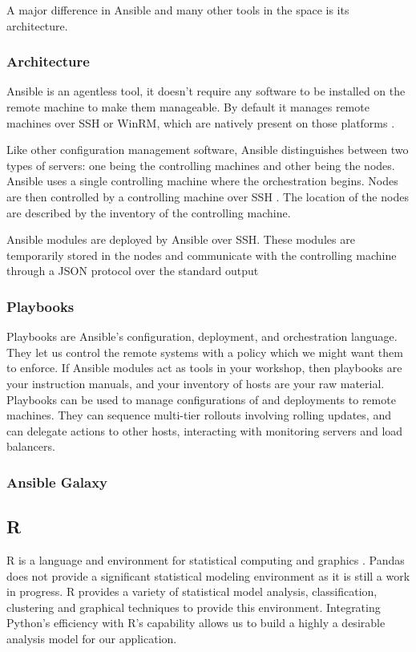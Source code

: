 \documentclass[9pt,twocolumn,twoside]{../../styles/osajnl}
\begin{document}
A major difference in Ansible and many other tools in the
space is its architecture.

\subsubsection{Architecture}
Ansible is an agentless tool, it doesn't require any software to be
installed on the remote machine to make them manageable. By default
it manages remote machines over SSH or WinRM, which are natively
present on those platforms \cite{www-ansible-architecture}.

Like other configuration management software, Ansible
distinguishes between two types of servers: one being the controlling
machines and other being the nodes. Ansible uses a single controlling
machine where the orchestration begins. Nodes are then controlled by a
controlling machine over SSH \cite{www-ssh}. The location of the nodes
are described by the inventory of the controlling machine.

Ansible modules are deployed by Ansible over SSH. These modules are
temporarily stored in the nodes and communicate with the controlling
machine through a JSON protocol over the standard output

\subsubsection{Playbooks}

Playbooks \cite{www-ansible-playbook} are Ansible’s configuration,
deployment, and orchestration language. They let us control the remote
systems with a policy which we might want them to enforce. If Ansible
modules act as tools in your workshop, then playbooks are your
instruction manuals, and your inventory of hosts are your raw
material. Playbooks can be used to manage configurations of and
deployments to remote machines. They can sequence multi-tier rollouts
involving rolling updates, and can delegate actions to other hosts,
interacting with monitoring servers and load balancers.

\subsubsection{Ansible Galaxy}

\subsection{R}
R is a language and environment for statistical computing and graphics
\cite{www-about-rproject}. Pandas does not provide a significant
statistical modeling environment as it is still a work in progress. R
provides a variety of statistical model analysis, classification,
clustering and graphical techniques to provide this
environment. Integrating Python's efficiency with R's capability
allows us to build a highly a desirable analysis model for our
application.
\end{document}
